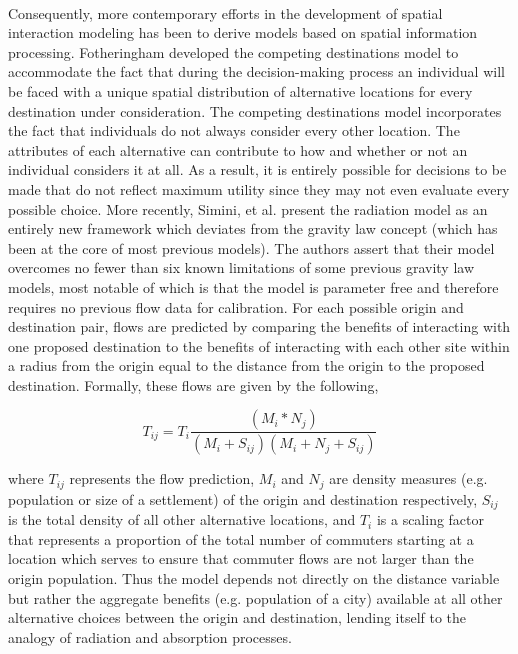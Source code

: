 \documentclass[12pt,a4paper]{thesis}
\begin{document}
\paragraph{}	
Consequently, more contemporary efforts in the development of spatial interaction modeling has been to derive models based on spatial information processing. Fotheringham \citeyearpar{Fot83} developed the competing destinations model to accommodate the fact that during the decision-making process an individual will be faced with a unique spatial distribution of alternative locations for every destination under consideration. The competing destinations model incorporates the fact that individuals do not always consider every other location. The attributes of each alternative can contribute to how and whether or not an individual considers it at all. As a result, it is entirely possible for decisions to be made that do not reflect maximum utility since they may not even evaluate every possible choice. More recently, Simini, et al. \citeyearpar{Bar12} present the radiation model as an entirely new framework which deviates from the gravity law concept (which has been at the core of most previous models). The authors assert that their model overcomes no fewer than six known limitations of some previous gravity law models, most notable of which is that the model is parameter free and therefore requires no previous flow data for calibration. For  each possible origin and destination pair, flows are predicted by comparing the benefits of interacting with one proposed destination to the benefits of interacting with each other site within a radius from the origin equal to the distance from the origin to the proposed destination. Formally, these flows are given by the following,
			
				\begin{equation}
				T_{ij} = T_{i}\frac{(M_{i}*N_{j})}{(M_{i}+S_{ij})(M_{i}+N_{j}+S_{ij})}
				\label{eq:originalRad}
				\end{equation}
				
where $T_{ij}$ represents the flow prediction, $M_{i}$ and $N_{j}$ are density measures (e.g. population or size of a settlement) of the origin and destination respectively, $S_{ij}$ is the total density of all other alternative locations, and $T_{i}$ is a scaling factor that represents a proportion of the total number of commuters starting at a location which serves to ensure that commuter flows are not larger than the origin population.  Thus the model depends not directly on the distance variable but rather the aggregate benefits (e.g. population of a city) available at all other alternative choices between the origin and destination, lending itself to the analogy of radiation and absorption processes. 
\end{document}
